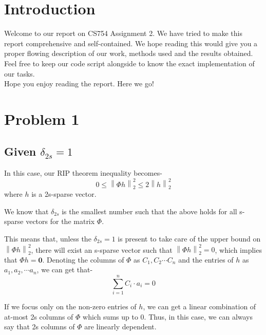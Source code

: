\documentclass[a4paper,11pt]{article}
\numberwithin{definition}{section}
\numberwithin{mytheorem}{subsection}
\newcommand\norm[1]{\left\lVert#1\right\rVert}
\begin{document}

\date{Spring 2022}
\maketitle

\justifying
\tableofcontents

\newpage
\justifying
\section*{Introduction}

Welcome  to our report on CS754 Assignment 2. We have tried to make this report comprehensive and self-contained. We hope reading this would give you a proper flowing description of our work, methods used and the results obtained. Feel free to keep our code script alongside to know the exact implementation of our tasks. \\


Hope you enjoy reading the report. Here we go!


\section{Problem 1}



\subsection{Given $\delta_{2s}=1$}

In this case, our RIP theorem inequality becomes-
$$0 \leq \norm{\Phi h}_2^2 \leq 2 \norm{h}_2^2$$
where $h$ is a 2s-sparse vector.

We know that $\delta_{2s}$ is the smallest number such that the above holds for all s-sparse vectors for the matrix $\Phi$.

This means that, unless the $\delta_{2s}=1$ is present to take care of the upper bound on $\norm{\Phi h}_2^2$, there will exist an s-sparse vector such that $\norm{\Phi h}_2^2=0$, which implies that $\Phi h =\boldsymbol{0}$. Denoting the columns of $\Phi$ as $C_1, C_2 \cdots C_n$ and the entries of $h$ as $a_1, a_2, \cdots a_n$, we can get that-
$$ \sum_{i=1}^n C_i \cdot a_i = 0 $$

If we focus only on the non-zero entries of $h$, we can get a linear combination of at-most 2s columns of $\Phi$ which sums up to 0. Thus, in this case, we can always say that 2s columns of $\Phi$ are linearly dependent.
\end{document}

